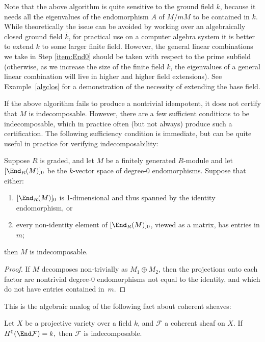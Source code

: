 \documentclass[12pt]{article}
\let\bar\overline
\def\F{\mathcal F}
\numberwithin{equation}{section}
\theoremstyle{theorem}
\numberwithin{thm}{section}
\theoremstyle{definition}
\begin{document}
\begin{rem}
  Note that the above algorithm is quite sensitive to the ground field $k$, because it needs all the eigenvalues of the endomorphism $A$ of $M/mM$ to be contained in $k$. While theoretically the issue can be avoided by working over an algebraically closed ground field $\bar k$, for practical use on a computer algebra system it is better to extend $k$ to some larger finite field. However, the general linear combinations we take in Step \ref{item:End0} should be taken with respect to the prime subfield (otherwise, as we increase the size of the finite field $k$, the eigenvalues of a general linear combination will live in higher and higher field extensions).
See Example~\ref{algclos} for a demonstration of the necessity of extending the base field.
\end{rem}

If the above algorithm fails to produce a nontrivial idempotent, it does not certify that $M$ is indecomposable. However, there are a few sufficient conditions to be indecomposable, which in practice often (but not always) produce such a certification.
The following sufficiency condition is immediate, but can be quite useful in practice for verifying indecomposability:

\begin{lem}
  Suppose $R$ is graded, and let $M$ be a finitely generated $R$-module and let $[\End_R(M)]_0$ be the $k$-vector space of degree-0 endomorphisms. Suppose that either:
  \begin{enumerate}
  \item $[\End_R(M)]_0$ is 1-dimensional and thus spanned by the identity endomorphism, or
  \item every non-identity element of $[\End_R(M)]_0$, viewed as a matrix, has entries in $m$;
  \end{enumerate}
  then $M$ is indecomposable.
\end{lem}

\begin{proof}
  If $M$ decomposes non-trivially as $M_1\oplus M_2$, then the projections onto each factor are nontrivial degree-0 endomorphisms not equal to the identity, and which do not have entries contained in~$m$.
\end{proof}

This is the algebraic analog of the following fact about coherent sheaves:

\begin{cor}
  Let $X$ be a projective variety over a field $k$, and $\F$ a coherent sheaf on $X$.
  If $ H^0(\End \F) = k, $ then $\F$ is indecomposable.
\end{cor}
\end{document}
